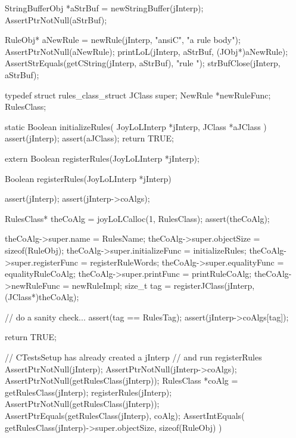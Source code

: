   StringBufferObj *aStrBuf = newStringBuffer(jInterp);
  AssertPtrNotNull(aStrBuf);
  
  RuleObj* aNewRule =
    newRule(jInterp, "ansiC", "a rule body");
  AssertPtrNotNull(aNewRule);
  printLoL(jInterp, aStrBuf, (JObj*)aNewRule);
  AssertStrEquals(getCString(jInterp, aStrBuf), "rule ");
  strBufClose(jInterp, aStrBuf);
\stopCTest
\stopTestCase
\stopTestSuite

\startTestSuite[registerRules]

\startCHeader
typedef struct rules_class_struct {
  JClass       super;
  NewRule      *newRuleFunc;
} RulesClass;

\stopCHeader

\startCCode
static Boolean initializeRules(
  JoyLoLInterp *jInterp,
  JClass   *aJClass
) {
  assert(jInterp);
  assert(aJClass);
  return TRUE;
}
\stopCCode

\startCHeader
extern Boolean registerRules(JoyLoLInterp *jInterp);
\stopCHeader
{}

\startCCode
Boolean registerRules(JoyLoLInterp *jInterp) {
  assert(jInterp);
  assert(jInterp->coAlgs);
  
  RulesClass* theCoAlg
    = joyLoLCalloc(1, RulesClass);
  assert(theCoAlg);
  
  theCoAlg->super.name           = RulesName;
  theCoAlg->super.objectSize     = sizeof(RuleObj);
  theCoAlg->super.initializeFunc = initializeRules;
  theCoAlg->super.registerFunc   = registerRuleWords;
  theCoAlg->super.equalityFunc   = equalityRuleCoAlg;
  theCoAlg->super.printFunc      = printRuleCoAlg;
  theCoAlg->newRuleFunc = newRuleImpl;
  size_t tag =
    registerJClass(jInterp, (JClass*)theCoAlg);
  
  // do a sanity check...
  assert(tag == RulesTag);
  assert(jInterp->coAlgs[tag]);
   
  return TRUE;
}
\stopCCode


\startCTest
  // CTestsSetup has already created a jInterp
  // and run registerRules
  AssertPtrNotNull(jInterp);
  AssertPtrNotNull(jInterp->coAlgs);
  AssertPtrNotNull(getRulesClass(jInterp));
  RulesClass *coAlg = getRulesClass(jInterp);
  registerRules(jInterp);
  AssertPtrNotNull(getRulesClass(jInterp));
  AssertPtrEquals(getRulesClass(jInterp), coAlg);
  AssertIntEquals(
    getRulesClass(jInterp)->super.objectSize,
    sizeof(RuleObj)
  )
\stopCTest
\stopTestCase
\stopTestSuite
